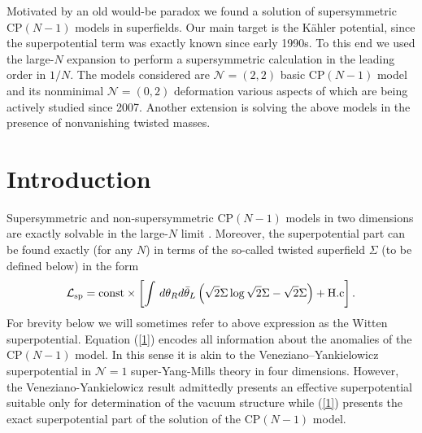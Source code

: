 \documentclass[epsfig,12pt]{article}
\def\beq{\begin{equation}}
\def\eeq{\end{equation}}
\begin{document}
\begin{titlepage}
\hspace{0.3cm}

Motivated by an old would-be paradox we found a solution of supersymmetric CP$(N-1)$ models in superfields.
Our main target is the  K\"ahler potential, since the superpotential term was exactly known since early 1990s. To this end we used the large-$N$ expansion to 
perform a supersymmetric calculation in the leading order in $1/N$. The models considered are ${\mathcal N}= (2,2)$ basic CP$(N-1)$ model and  its nonminimal ${\mathcal N}= (0,2)$ deformation various aspects of which are being actively studied since 2007. Another extension  is solving the above models in the presence of 
nonvanishing twisted masses. 
\vspace{2cm}


\end{titlepage}


\section{Introduction}
\label{sec1}

Supersymmetric and non-supersymmetric CP$(N-1)$ models in two dimensions are exactly solvable in the large-$N$ limit \cite{0,1p,SYhet}. Moreover, the superpotential part can be found exactly (for any $N$) \cite{1,2,3} in terms of the so-called twisted superfield $\Sigma$ (to be defined below) in the form
\beq
{\mathcal L}_{\rm sp} = {\rm const} \times\left[ \int\, d\theta_Rd\bar\theta_L \left( \sqrt{2}\Sigma
\log \sqrt{2}\Sigma -  \sqrt{2}\Sigma\right) +{\rm H.c}\right].
\label{1}
\eeq
For brevity below we will sometimes refer to above expression as the Witten superpotential.
Equation (\ref{1})  encodes all information about the anomalies of the CP$(N-1)$ model. In this sense it is akin to the Veneziano--Yankielowicz superpotential \cite{Veneziano} in ${\mathcal N}=1$ super-Yang-Mills theory in four dimensions. However, the Veneziano-Yankielowicz result admittedly presents an effective superpotential suitable only for determination of the vacuum structure while (\ref{1}) presents the exact superpotential part of the solution of the CP$(N-1)$ model.
\end{document}
